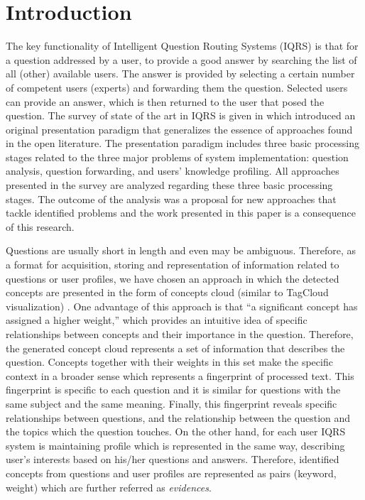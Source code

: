 \documentclass[conference]{IEEEtran}
\begin{document}
\vspace{-0.3cm}
\section{Introduction}
The key functionality of Intelligent Question Routing Systems (IQRS) is that for a question addressed by a user, to provide a good answer by searching the list of all (other) available users. The answer is provided by selecting a certain number of competent users (experts) and forwarding them the question. Selected users can provide an answer, which is then returned to the user that posed the question. The survey of state of the art in IQRS is given in \cite{bib:survey2013} which introduced an original presentation paradigm that generalizes the essence of approaches found in the open literature. The presentation paradigm includes three basic processing stages related to the three major problems of system implementation: question analysis, question forwarding, and users' knowledge profiling. All approaches presented in the survey are analyzed regarding these three basic processing stages. The outcome of the analysis was a proposal for new approaches that tackle identified problems and the work presented in this paper is a consequence of this research.

Questions are usually short in length and even may be ambiguous. Therefore, as a format for acquisition, storing and representation of information related to questions or user profiles, we have chosen an approach in which the detected concepts are presented in the form of concepts cloud (similar to TagCloud visualization) \cite{bib:TAG07, bib:TAG08}. One advantage of this approach is that ``a significant concept has assigned a higher weight,'' which provides an intuitive idea of specific relationships between concepts and their importance in the question. Therefore, the generated concept cloud represents a set of information that describes the question. Concepts together with their weights in this set make the specific context in a broader sense which represents a fingerprint of processed text. This fingerprint is specific to each question and it is similar for questions with the same subject and the same meaning. Finally, this fingerprint reveals specific relationships between questions, and the relationship between the question and the topics which the question touches. On the other hand, for each user IQRS system is maintaining profile which is represented in the same way, describing user’s interests based on his/her questions and answers. Therefore, identified concepts from questions and user profiles are represented as pairs (keyword, weight) which are further referred as {\it evidences}.
\end{document}
